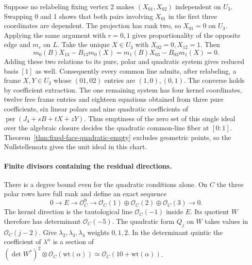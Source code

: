 Suppose no relabeling fixing vertex 2 makes \((X_{01},X_{02})\)
independent on \(U_3\). Swapping 0 and 1 shows that both pairs involving
\(X_{01}\) in the first three coordinates are dependent. The projection
has rank two, so \(X_{01}=0\) on \(U_3\). Applying the same argument with
\(r=0,1\) gives proportionality of the opposite edge and \(m_r\) on \(L\).
Take the unique \(X\in U_3\) with \(X_{02}=0,X_{12}=1\). Then
\[
    m_0(B)X_{13}-B_{13}m_0(X)=
    m_1(B)X_{03}-B_{03}m_1(X)=0 .
\]
Adding these two relations to its pure, polar and quadratic system gives
reduced basis \([1]\) as well. Consequently every common line admits,
after relabeling, a frame \(X,Y\in U_3\) whose \((01,02)\) entries are
\((1,0),(0,1)\). The converse holds by coefficient extraction. The one
remaining system has four kernel coordinates, twelve free frame entries
and eighteen equations obtained from three pure coefficients, six
linear polars and nine quadratic coefficients of \(\operatorname{per}(J_4+sB+tX+zY)\).
Thus emptiness of the zero set of this single ideal over the algebraic closure decides
the quadratic common-line fiber at \([0:1]\). Theorem~\ref{thm:fixed-face-quadratic-empty}
excludes geometric points, so the Nullstellensatz gives the unit ideal in this chart.

\paragraph{Finite divisors containing the residual directions.}
There is a degree bound even for the quadratic conditions alone. On
\(C\) the three polar rows have full rank and define an exact sequence
\[
 0\longrightarrow E\longrightarrow\mathcal O_C^9\longrightarrow
 \mathcal O_C(1)\oplus\mathcal O_C(2)\oplus\mathcal O_C(3)
 \longrightarrow 0 .
\]
The kernel direction is the tautological line \(\mathcal O_C(-1)\)
inside \(E\). Its quotient \(W\) therefore has determinant
\(\mathcal O_C(-5)\). The quadratic form \(Q_j\) on \(W\) takes
values in \(\mathcal O_C(j-2)\). Give \(\lambda_2,\lambda_3,\lambda_4\)
weights \(0,1,2\). In the determinant quintic the coefficient of
\(\lambda^\alpha\) is a section of
\((\det W^*)^2\otimes\mathcal O_C(\mathrm{wt}(\alpha))
\simeq\mathcal O_C(10+\mathrm{wt}(\alpha))\).

